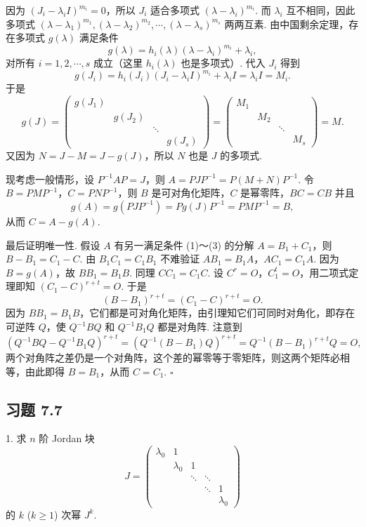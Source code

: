 \documentclass[UTF8,12pt,a4paper,fontset=fandol]{ctexart}
\begin{document}
因为 $(J_i-\lambda_iI)^{m_i}=0$，所以 $J_i$ 适合多项式 $(\lambda-\lambda_i)^{m_i}$. 而 $\lambda_i$ 互不相同，因此多项式 $(\lambda-\lambda_1)^{m_1},(\lambda-\lambda_2)^{m_2},\cdots,(\lambda-\lambda_s)^{m_s}$ 两两互素. 由中国剩余定理，存在多项式 $g(\lambda)$ 满足条件
\[
g(\lambda)=h_i(\lambda)(\lambda-\lambda_i)^{m_i}+\lambda_i,
\]
对所有 $i=1,2,\cdots,s$ 成立（这里 $h_i(\lambda)$ 也是多项式）. 代入 $J_i$ 得到
\[
g(J_i)=h_i(J_i)(J_i-\lambda_iI)^{m_i}+\lambda_iI=\lambda_iI=M_i.
\]
于是
\[
g(J)=\left(\begin{array}{cccc}
g(J_1) & & & \\
& g(J_2) & & \\
& & \ddots & \\
& & & g(J_s)
\end{array}\right)
=\left(\begin{array}{cccc}
M_1 & & & \\
& M_2 & & \\
& & \ddots & \\
& & & M_s
\end{array}\right)=M.
\]
又因为 $N=J-M=J-g(J)$，所以 $N$ 也是 $J$ 的多项式.

现考虑一般情形，设 $P^{-1}AP=J$，则 $A=PJP^{-1}=P(M+N)P^{-1}$. 令 $B=PMP^{-1}$，$C=PNP^{-1}$，则 $B$ 是可对角化矩阵，$C$ 是幂零阵，$BC=CB$ 并且
\[
g(A)=g(PJP^{-1})=Pg(J)P^{-1}=PMP^{-1}=B,
\]
从而 $C=A-g(A)$.

最后证明唯一性. 假设 $A$ 有另一满足条件 (1)～(3) 的分解 $A=B_1+C_1$，则 $B-B_1=C_1-C$. 由 $B_1C_1=C_1B_1$ 不难验证 $AB_1=B_1A$，$AC_1=C_1A$. 因为 $B=g(A)$，故 $BB_1=B_1B$. 同理 $CC_1=C_1C$. 设 $C^r=O$，$C_1^t=O$，用二项式定理即知 $(C_1-C)^{r+t}=O$. 于是
\[
(B-B_1)^{r+t}=(C_1-C)^{r+t}=O.
\]
因为 $BB_1=B_1B$，它们都是可对角化矩阵，由引理知它们可同时对角化，即存在可逆阵 $Q$，使 $Q^{-1}BQ$ 和 $Q^{-1}B_1Q$ 都是对角阵. 注意到
\[
(Q^{-1}BQ-Q^{-1}B_1Q)^{r+t}=(Q^{-1}(B-B_1)Q)^{r+t}=Q^{-1}(B-B_1)^{r+t}Q=O,
\]
两个对角阵之差仍是一个对角阵，这个差的幂零等于零矩阵，则这两个矩阵必相等，由此即得 $B=B_1$，从而 $C=C_1$. $\square$

\subsection*{习题 7.7}

1. 求 $n$ 阶 Jordan 块
\[
J=\left(\begin{array}{ccccc}
\lambda_0 & 1 & & & \\
& \lambda_0 & 1 & & \\
& & \ddots & \ddots & \\
& & & \ddots & 1\\
& & & & \lambda_0
\end{array}\right)
\]
的 $k$ ($k\geq 1$) 次幂 $J^k$.
\end{document}
